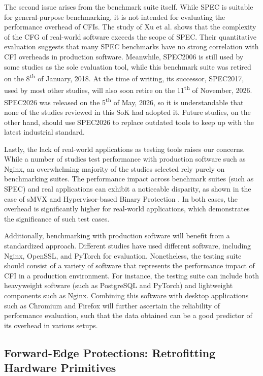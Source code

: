 \documentclass[journal,onecolumn]{IEEEtran}
\begin{document}
The second issue arises from the benchmark suite itself. While SPEC is suitable for general-purpose benchmarking, it is not intended for evaluating the performance overhead of CFIs. The study of Xu et al.\cite{Xu19} shows that the complexity of the CFG of real-world software exceeds the scope of SPEC. Their quantitative evaluation suggests that many SPEC benchmarks have no strong correlation with CFI overheads in production software. Meanwhile, SPEC2006 is still used by some studies as the sole evaluation tool, while this benchmark suite was retired on the 8\textsuperscript{th} of January, 2018. At the time of writing, its successor, SPEC2017, used by most other studies, will also soon retire on the 11\textsuperscript{th} of November, 2026.  SPEC2026 was released on the 5\textsuperscript{th} of May, 2026, so it is understandable that none of the studies reviewed in this SoK had adopted it. Future studies, on the other hand, should use SPEC2026 to replace outdated tools to keep up with the latest industrial standard.

Lastly, the lack of real-world applications as testing tools raises our concerns. While a number of studies test performance with production software such as Nginx, an overwhelming majority of the studies selected rely purely on benchmarking suites. The performance impact across benchmark suites (such as SPEC) and real applications can exhibit a noticeable disparity, as shown in the case of sMVX \cite{Yeoh24} and Hypervisor-based Binary Protection \cite{Zaidenberg26}. In both cases, the overhead is significantly higher for real-world applications, which demonstrates the significance of such test cases.

Additionally, benchmarking with production software will benefit from a standardized approach. Different studies have used different software, including Nginx, OpenSSL, and PyTorch for evaluation. Nonetheless, the testing suite should consist of a variety of software that represents the performance impact of CFI in a production environment. For instance, the testing suite can include both heavyweight software (such as PostgreSQL and PyTorch) and lightweight components such as Nginx. Combining this software with desktop applications such as Chromium and Firefox will further ascertain the reliability of performance evaluation, such that the data obtained can be a good predictor of its overhead in various setups.

\subsection{Forward-Edge Protections: Retrofitting Hardware Primitives}
\end{document}
